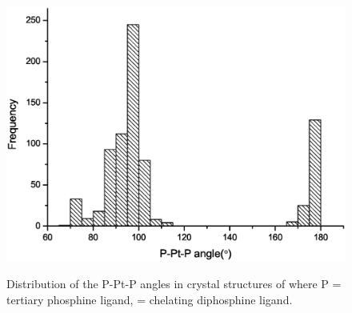 \begin{figure}[htb]
\begin{center}
\vspace{0.5cm}
\includegraphics[width=\textwidth]{../Figures/Platinumdichloridegraph.eps}
\caption[Distribution of the P-Pt-P angles in \ce{[PtCl2(P2){]}} complexes]{Distribution of the P-Pt-P angles in crystal structures of \ce{[PtCl2(P2)]} where P = tertiary phosphine ligand,  = chelating diphosphine ligand.}
\vspace{0.2cm}
\label{PtCl2graph}
\end{center}
\end{figure}
\vspace{0.2cm}

